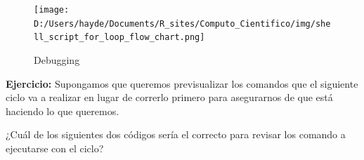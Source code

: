 \documentclass[
]{book}
\newenvironment{Shaded}{\begin{snugshade}}{\end{snugshade}}
\newcommand{\CommentTok}[1]{\textcolor[rgb]{0.56,0.35,0.01}{\textit{#1}}}
\newcommand{\ExtensionTok}[1]{#1}
\newcommand{\FunctionTok}[1]{\textcolor[rgb]{0.13,0.29,0.53}{\textbf{#1}}}
\newcommand{\NormalTok}[1]{#1}
\newcommand{\OperatorTok}[1]{\textcolor[rgb]{0.81,0.36,0.00}{\textbf{#1}}}
\newcommand{\PreprocessorTok}[1]{\textcolor[rgb]{0.56,0.35,0.01}{\textit{#1}}}
\newcommand{\StringTok}[1]{\textcolor[rgb]{0.31,0.60,0.02}{#1}}
\newcommand{\VariableTok}[1]{\textcolor[rgb]{0.00,0.00,0.00}{#1}}
\begin{document}
\begin{Shaded}
\end{Shaded}

\begin{figure}
\centering
\texttt{[image: D:/Users/hayde/Documents/R\_sites/Computo\_Cientifico/img/shell\_script\_for\_loop\_flow\_chart.png]}
\caption{Debugging}
\end{figure}

\textbf{Ejercicio:} Supongamos que queremos previsualizar los comandos que el siguiente ciclo va a realizar en lugar de correrlo primero para asegurarnos de que está haciendo lo que queremos.

\begin{Shaded}
\end{Shaded}

¿Cuál de los siguientes dos códigos sería el correcto para revisar los comando a ejecutarse con el ciclo?

\begin{Shaded}
\end{Shaded}

\begin{Shaded}
\end{Shaded}
\end{document}
